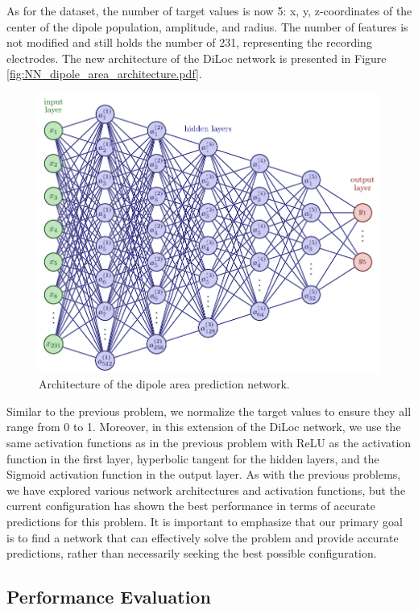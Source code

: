 \documentclass[a4paper, UKenglish, 11pt]{uiomaster}
\begin{document}
As for the dataset, the number of target values is now 5: x, y, z-coordinates of the center of the dipole population, amplitude, and radius. The number of features is not modified and still holds the number of 231, representing the recording electrodes. The new architecture of the DiLoc network is presented in Figure \ref{fig:NN_dipole_area_architecture.pdf}.

\begin{figure}[!htb]
\centering
\includegraphics[width=\linewidth]{figures/NN_dipole_area_architecture.pdf}
\caption{Architecture of the dipole area prediction network.}
\label{fig:NN_dipole_area_architecture}
\end{figure}

Similar to the previous problem, we normalize the target values to ensure they all range from 0 to 1. Moreover, in this extension of the DiLoc network, we use the same activation functions as in the previous problem with ReLU as the activation function in the first layer, hyperbolic tangent for the hidden layers, and the Sigmoid activation function in the output layer. As with the previous problems, we have explored various network architectures and activation functions, but the current configuration has shown the best performance in terms of accurate predictions for this problem. It is important to emphasize that our primary goal is to find a network that can effectively solve the problem and provide accurate predictions, rather than necessarily seeking the best possible configuration.


\subsection{Performance Evaluation}
\end{document}
